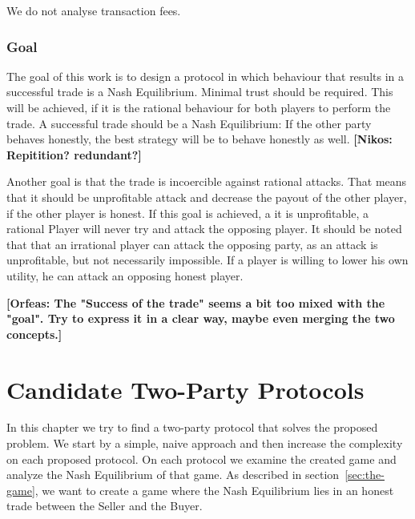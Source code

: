 \documentclass{cacthesis}
\newcommand{\authnote}[3]{{ \footnotesize \textbf{#1[#2: #3]~}}}
\newcommand{\orfnote}[1]{\authnote{\color{blue}}{Orfeas}{#1}}
\newcommand{\niknote}[1]{\authnote{\color{red}}{Nikos}{#1}}
\begin{document}
We do not analyse transaction fees. 

\subsection{Goal}
\label{sec:goal}
The goal of this work is to design a protocol in which behaviour that results in a successful trade is a Nash Equilibrium. Minimal trust should be required. This will be achieved, if it is the rational behaviour for both players to perform the trade. A successful trade should be a Nash Equilibrium: If the other party behaves honestly, the best strategy will be to behave honestly as well.\niknote{Repitition? redundant?}\newline

Another goal is that the trade is incoercible against rational attacks. That means that it should be unprofitable attack and decrease the payout of the other player, if the other player is honest. If this goal is achieved, a it is unprofitable, a rational Player will never try and attack the opposing player. It should be noted that that an irrational player can attack the opposing party, as an attack is unprofitable, but not necessarily impossible. If a player is willing to lower his own utility, he can attack an opposing honest player. 

\orfnote{The "Success of the trade" seems a bit too mixed with the "goal". Try
to express it in a clear way, maybe even merging the two concepts.}


\chapter{Candidate Two-Party Protocols}
In this chapter we try to find a two-party protocol that solves the proposed problem. We start by a simple, naive approach and then increase the complexity on each proposed protocol. On each protocol we examine the created game and analyze the Nash Equilibrium of that game. As described in section~\ref{sec:the-game}, we want to create a game where the Nash Equilibrium lies in an honest trade between the Seller and the Buyer.
\end{document}
